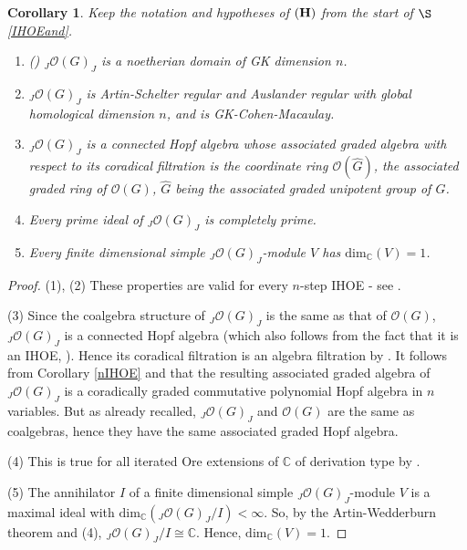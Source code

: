 \documentclass{amsart}
\numberwithin{equation}{section}
\newtheorem{corollary}[theorem]{Corollary}
\theoremstyle{definition}
\begin{document}
\begin{corollary}\label{IHOEcor} Keep the notation and hypotheses of ${\bf(H)}$ from the start of $\S$\ref{IHOEand}.
\begin{enumerate}
\item {\rm (\cite[Corollary 3.2]{G2})} ${}_J\mathcal{O}(G)_J$ is a noetherian domain of GK dimension $n$.
\item ${}_J\mathcal{O}(G)_J$ is Artin-Schelter regular and Auslander regular with global homological dimension $n$, and is GK-Cohen-Macaulay.
\item ${}_J\mathcal{O}(G)_J$ is a connected Hopf algebra whose associated graded algebra with respect to its coradical filtration is the coordinate ring $\mathcal{O}(\widehat{G})$, the associated graded ring of $\mathcal{O}(G)$, $\widehat{G}$ being the associated graded unipotent group of $G$.
\item Every prime ideal of ${}_J\mathcal{O}(G)_J$ is completely prime.
\item Every finite dimensional simple ${}_J\mathcal{O}(G)_J$-module $V$ has $\mathrm{dim}_{\mathbb{C}}(V) = 1$.
\end{enumerate}
\end{corollary}

\begin{proof}(1), (2) These properties are valid for every $n$-step IHOE - see \cite[Theorem 3.2(2),(5)]{BOZZ}.

(3) Since the coalgebra structure of $_J\mathcal{O}(G)_J$ is the same as that of $\mathcal{O}(G)$, ${}_J\mathcal{O}(G)_J$ is a connected Hopf algebra (which also follows from the fact that it is an IHOE, \cite[Theorem 3.2(1)]{BOZZ}). Hence its coradical filtration is an algebra filtration by \cite[Lemma 5.2.8]{M}. It follows from Corollary \ref{nIHOE} and \cite[Theorem 3.2(4)]{BOZZ} that the resulting associated graded algebra of ${}_J\mathcal{O}(G)_J$ is a coradically graded commutative polynomial Hopf algebra in $n$ variables. But as already recalled, ${}_J\mathcal{O}(G)_J$ and $\mathcal{O}(G)$ are the same as coalgebras, hence they have the same associated graded Hopf algebra.

(4) This is true for all iterated Ore extensions of $\mathbb{C}$ of derivation type by \cite{L}.

(5) The annihilator $I$ of a finite dimensional simple ${}_J\mathcal{O}(G)_J$-module $V$ is a maximal ideal with $\mathrm{dim}_{\mathbb{C}}({}_J\mathcal{O}(G)_J/I) < \infty$. So, by the Artin-Wedderburn theorem and (4), ${}_J\mathcal{O}(G)_J/I \cong \mathbb{C}$. Hence, $\mathrm{dim}_{\mathbb{C}}(V) = 1$.
\end{proof}
\end{document}
